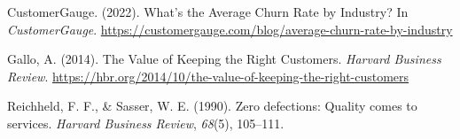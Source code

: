 \documentclass[
]{article}
\newlength{\cslhangindent}
\newlength{\cslentryspacingunit} %
\newenvironment{CSLReferences}[2] %
 {%
  \setlength{\parindent}{0pt}
  \ifodd #1
  \let\oldpar\par
  \def\par{\hangindent=\cslhangindent\oldpar}
  \fi
  \setlength{\parskip}{#2\cslentryspacingunit}
 }%
 {}
\begin{document}
\hypertarget{refs}{}
\begin{CSLReferences}{1}{0}
\leavevmode{}%
CustomerGauge. (2022). What's the {Average} {Churn} {Rate} by
{Industry}? In \emph{CustomerGauge}.
\url{https://customergauge.com/blog/average-churn-rate-by-industry}

\leavevmode{}%
Gallo, A. (2014). The {Value} of {Keeping} the {Right} {Customers}.
\emph{Harvard Business Review}.
\url{https://hbr.org/2014/10/the-value-of-keeping-the-right-customers}

\leavevmode{}%
Reichheld, F. F., \& Sasser, W. E. (1990). Zero defections: {Quality}
comes to services. \emph{Harvard Business Review}, \emph{68}(5),
105--111.

\end{CSLReferences}
\end{document}
